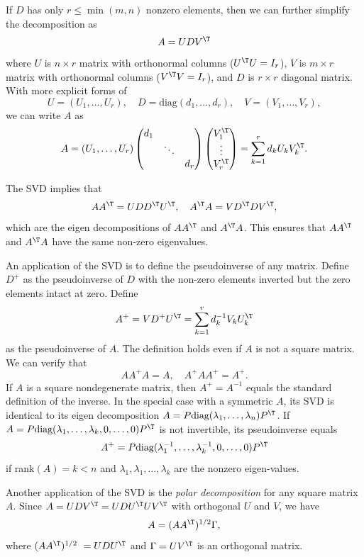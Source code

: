 If $D$ has only $r \leq \min(m,n)$ nonzero elements, then we can further simplify the decomposition as
$$
A = U D  V^{\T}
$$
where $U$ is $n\times r$ matrix with orthonormal columns ($U^{\T} U = I_r$), $V$ is $m \times r$ matrix with orthonormal columns ($V^{\T} V = I_r$), and $D$ is $r\times r$ diagonal matrix. With more explicit forms of 
$$
U = (U_{1}, \ldots, U_{r}), \quad D = \text{diag}(d_1, \ldots, d_r),\quad V =  (V_{1}, \ldots, V_{r}),
$$
we can write $A$ as
$$
A = (U_{1}, \ldots, U_{r}) \begin{pmatrix}
d_1 & &  \\
 &  \ddots & \\
 & & d_r
\end{pmatrix}
\begin{pmatrix}
V_1^{\T} \\
\vdots \\
V_r^{\T}
\end{pmatrix}
= \sum_{k=1}^r  d_k U_k V_k^{\T}. 
$$

The SVD implies that
$$
AA^{\T} = UDD^{\T} U^{\T},\quad
A^{\T} A = V D^{\T}  D V^{\T} ,
$$
which are the eigen decompositions of $AA^{\T}$ and $A^{\T} A $. This ensures that $AA^{\T} $ and $A^{\T} A $ have the same non-zero eigenvalues. 


An application of the SVD is to define the pseudoinverse of any matrix. Define $D^{+}$ as the pseudoinverse of $D$ with the non-zero elements inverted but the zero elements intact at zero. Define
$$
A^{+} = V D^{+} U^{\T} =  \sum_{k=1}^r d_k^{-1} V_k U_k^{\T} 
$$
as the pseudoinverse of $A$. The definition holds even if $A$ is not a square matrix. We can verify that 
$$
AA^{+} A = A, \quad 
A^{+}AA^{+} = A^{+}.
$$
If $A$ is a square nondegenerate matrix, then $A^{+} = A^{-1}$ equals the standard definition of the inverse. 
In the special case with a symmetric $A$, its SVD is identical to its eigen decomposition $A = P\text{diag}(\lambda_1, \ldots, \lambda_n) P^{\T}  $. If $A = P\text{diag}(\lambda_1, \ldots, \lambda_k, 0, \ldots, 0) P^{\T} $ is not invertible, its pseudoinverse equals
$$
A^{+} = P\text{diag}(\lambda_1^{-1}, \ldots, \lambda_k^{-1}, 0, \ldots, 0) P^{\T} 
$$
if rank$(A) = k < n$ and $\lambda_1,\lambda_1, \ldots, \lambda_k$ are the nonzero eigen-values. 




Another application of the SVD is the  {\it polar decomposition} for any square matrix $A$. Since $A = UDV^{\T} = UDU^{\T} UV^{\T}$ with orthogonal $U$ and $V$, we have
\begin{equation}
\label{eq::polar-decompose}
A = (AA^{\T})^{1/2}\Gamma,
\end{equation}
where $ (AA^{\T})^{1/2}\ = UDU^{\T} $ and $\Gamma =  UV^{\T}$ is an orthogonal matrix. 


